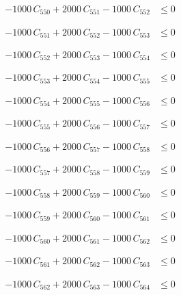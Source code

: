 \documentclass[a4paper,11pt]{article}
\begin{document}
\begin{align}
-1000\,C_{550} + 2000\,C_{551} - 1000\,C_{552} &\leq 0 \nonumber
\end{align}

\begin{align}
-1000\,C_{551} + 2000\,C_{552} - 1000\,C_{553} &\leq 0 \nonumber
\end{align}

\begin{align}
-1000\,C_{552} + 2000\,C_{553} - 1000\,C_{554} &\leq 0 \nonumber
\end{align}

\begin{align}
-1000\,C_{553} + 2000\,C_{554} - 1000\,C_{555} &\leq 0 \nonumber
\end{align}

\begin{align}
-1000\,C_{554} + 2000\,C_{555} - 1000\,C_{556} &\leq 0 \nonumber
\end{align}

\begin{align}
-1000\,C_{555} + 2000\,C_{556} - 1000\,C_{557} &\leq 0 \nonumber
\end{align}

\begin{align}
-1000\,C_{556} + 2000\,C_{557} - 1000\,C_{558} &\leq 0 \nonumber
\end{align}

\begin{align}
-1000\,C_{557} + 2000\,C_{558} - 1000\,C_{559} &\leq 0 \nonumber
\end{align}

\begin{align}
-1000\,C_{558} + 2000\,C_{559} - 1000\,C_{560} &\leq 0 \nonumber
\end{align}

\begin{align}
-1000\,C_{559} + 2000\,C_{560} - 1000\,C_{561} &\leq 0 \nonumber
\end{align}

\begin{align}
-1000\,C_{560} + 2000\,C_{561} - 1000\,C_{562} &\leq 0 \nonumber
\end{align}

\begin{align}
-1000\,C_{561} + 2000\,C_{562} - 1000\,C_{563} &\leq 0 \nonumber
\end{align}

\begin{align}
-1000\,C_{562} + 2000\,C_{563} - 1000\,C_{564} &\leq 0 \nonumber
\end{align}
\end{document}
